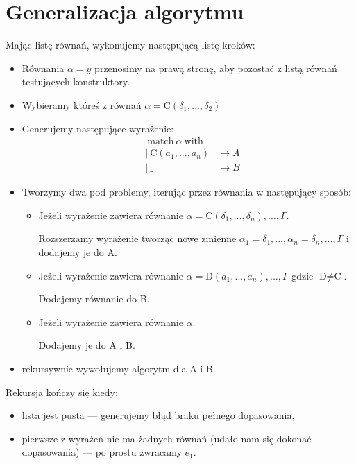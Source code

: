 \documentclass[a4paper,12pt]{book} %
\begin{document}
\section{Generalizacja algorytmu}
Mając listę równań, wykonujemy następującą listę kroków:
\begin{itemize}
  \item Równania $\alpha=y$ przenosimy na prawą stronę, aby pozostać z listą równań testujących konstruktory.
  \item Wybieramy któreś z równań $\alpha=\text{C}(\delta_1,...,\delta_2)$
  \item Generujemy następujące wyrażenie:
        \begin{align*}
           & \ \text{match}\ \alpha\ \text{with}                 \\
           & |\  \text{C}(a_1,..., a_n)          & \rightarrow A \\
           & |\ \_                               & \rightarrow B
        \end{align*}
  \item Tworzymy dwa pod problemy, iterując przez równania w następujący sposób:
        \begin{itemize}
          \item Jeżeli wyrażenie zawiera równanie $\alpha=\text{C}(\delta_1,..., \delta_n),...,\Gamma$.

                Rozszerzamy wyrażenie tworząc nowe zmienne $\alpha_1=\delta_1,...,\alpha_n=\delta_n,...,\Gamma$ i dodajemy je do A.
          \item Jeżeli wyrażenie zawiera równanie $\alpha=\text{D}(a_1,..., a_n),...,\Gamma$ gdzie $\text{D}\ne\text{C}$.

                Dodajemy równanie do B.

          \item Jeżeli wyrażenie zawiera równanie $\alpha$.

                Dodajemy je do A i B.
        \end{itemize}
  \item rekursywnie wywołujemy algorytm dla A i B.
\end{itemize}
Rekursja kończy się kiedy:
\begin{itemize}
  \item lista jest pusta --- generujemy błąd braku pełnego dopasowania,
  \item pierwsze z wyrażeń nie ma żadnych równań (udało nam się dokonać dopasowania) --- po prostu zwracamy $e_1$.
\end{itemize}
\end{document}
